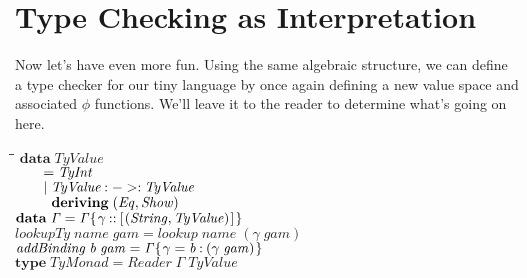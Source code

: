 \documentclass[10pt]{article}
\newlength{\lwidth}\setlength{\lwidth}{4.5cm}
\newlength{\cwidth}\setlength{\cwidth}{8mm} %
\newcommand{\Conid}[1]{\mathit{#1}}
\newcommand{\Varid}[1]{\mathit{#1}}
\begin{document}
\section{Type Checking as Interpretation}

Now let's have even more fun.  Using the same algebraic structure, we
can define a type checker for our tiny language by once again defining
a new value space and associated \ensuremath{\Varid{\phi}} functions.  We'll leave it to
the reader to determine what's going on here.

\begin{tabbing}
\qquad\=\hspace{\lwidth}\=\hspace{\cwidth}\=\+\kill
${\mathbf{data}\;\Conid{TyValue}}$\\
${\hskip2.00em\relax\mathrel{=}\Conid{TyInt}}$\\
${\hskip2.00em\relax\mid \Conid{TyValue}\mathbin{:->:}\Conid{TyValue}}$\\
${\hskip2.00em\relax\phantom{\mid \mbox{}}\mathbf{deriving}\;(\Conid{Eq},\Conid{Show})}$\\
${}$\\
${\mathbf{data}\;\Varid{\Gamma}\mathrel{=}\Varid{\Gamma}\{\mskip1.5mu \Varid{\gamma}\mathbin{::}[\mskip1.5mu (\Conid{String},\Conid{TyValue})\mskip1.5mu]\mskip1.5mu\}}$\\
${}$\\
${\Varid{lookupTy}\;\Varid{name}\;\Varid{gam}\mathrel{=}\Varid{lookup}\;\Varid{name}\;(\Varid{\gamma}\;\Varid{gam})}$\\
${}$\\
${\Varid{addBinding}\;\Varid{b}\;\Varid{gam}\mathrel{=}\Varid{\Gamma}\{\mskip1.5mu \Varid{\gamma}\mathrel{=}\Varid{b}\mathbin{:}(\Varid{\gamma}\;\Varid{gam})\mskip1.5mu\}}$\\
${}$\\
${\mathbf{type}\;\Conid{TyMonad}\mathrel{=}\Conid{Reader}\;\Varid{\Gamma}\;\Conid{TyValue}}$
\end{tabbing}
\end{document}
